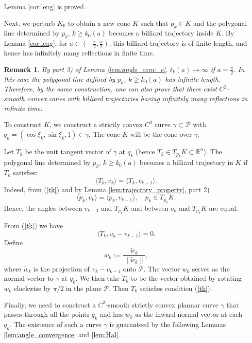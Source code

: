 \documentclass[12pt]{article}
\newtheorem{remark}{Remark}
\begin{document}
Lemma \ref{cor:leng} is proved.  

\vspace*{1em}

Next, we perturb $K_0$ to obtain a new cone $K$ such that $p_k \in K$ and the polygonal line determined by $p_k$, $k \geq k_0(a)$ becomes a billiard trajectory inside $K$.
By Lemma \ref{cor:leng}, for $a \in \left(-\frac{\pi}{2}, \frac{\pi}{2}\right)$, this billiard trajectory is of finite length, and hence has infinitely many reflections in finite time.


\begin{remark}
  By part 3) of Lemma \ref{lem:angle_conv_c},
  $t_k(a)\to \infty$ if $a=\frac{\pi}{2}$.
  In this case
  the polygonal line defined by $p_k$, $k\geq k_0(a)$ has infinite length. 
  Therefore, by the same construction, one can also prove that 
  there exist $C^2$-smooth convex cones with billiard trajectories having infinitely many reflections in infinite time.
\end{remark}


To construct $K$, we construct a strictly convex $C^2$ curve $\gamma \subset \mathcal{P}$ with $q_k = (\cos \xi_k, \sin \xi_k, 1) \in \gamma$. The cone $K$ will be the cone over $\gamma$.

Let $T_k$ be the unit tangent vector of $\gamma$ at $q_k$ (hence $T_k \in T_{p_k}K \subset \mathbb{R}^n$). 
The polygonal line determined by $p_k$, $k \geq k_0(a)$ becomes a billiard trajectory in $K$ if $T_k$ satisfies:
\begin{equation}\label{tk}
\langle T_k, {v}_{k} \rangle = \langle T_k, {v}_{k-1} \rangle.
\end{equation}
Indeed, from (\ref{tk}) and by
Lemma \ref{lem:trajectory_property}, part 2)
$$
\langle p_k, {v}_{k} \rangle = \langle p_k, {v}_{k-1} \rangle, 
\quad p_k \in T_{p_k} K.
$$
Hence, the angles between ${v}_{k-1}$ and $T_{p_k}K$ and between ${v}_{k}$ and $T_{p_k}K$ are equal.

From (\ref{tk}) we have
$$
\langle T_k, {v}_{k} - {v}_{k-1} \rangle = 0.
$$
Define
$$
w_k := \frac{\tilde{w}_k}{\|\tilde{w}_k\|},
$$
where $\tilde{w}_k$ is the projection of ${v}_{k} - {v}_{k-1}$ onto $\mathcal{P}$. The vector $w_k$ serves as the normal vector to $\gamma$ at $q_k$. We then take $T_k$ to be the vector obtained by rotating $w_k$ clockwise by $\pi/2$ in the plane $\mathcal{P}$. 
Then $T_k$ satisfies condition (\ref{tk}).

Finally, we need to construct a $C^2$-smooth strictly convex plannar curve $\gamma$ 
that passes through all the points $q_k$ and has $w_k$ as the inward normal vector at each $q_k$. 
The existence of such a curve $\gamma$ is guaranteed by the following Lemmas \ref{lem:angle_convergence} and \ref{lem:Hal}.
\end{document}
